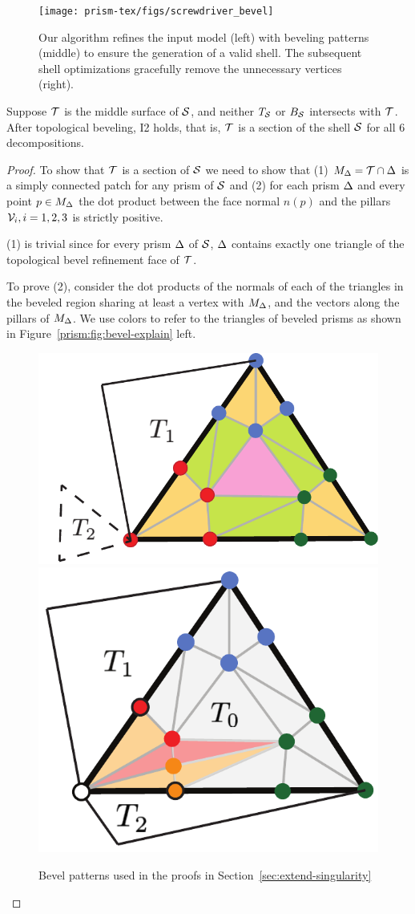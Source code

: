 \begin{figure}
    \texttt{[image: prism-tex/figs/screwdriver\_bevel]}
    \caption{Our algorithm refines the input model (left) with beveling patterns (middle) to ensure the generation of a valid shell. The subsequent shell optimizations gracefully remove the unnecessary vertices (right).}
    \label{prism:fig:beveled_example}
    
\end{figure}

\begin{theorem}
\label{thm:bevel}
Suppose $\T$ is the middle surface of $\S$, and neither $T_\S$ or $B_\S$ intersects with $\T$. After topological beveling, I2 holds, that is, $\T$ is a section of the shell $\S$ for all 6 decompositions.
\end{theorem}
\begin{proof}
    To show that $\T$ is a section of $\S$ we need to show that (1) $M_\Prism= \T \cap \Prism$ is a simply connected patch  for any prism of $\S$
and (2) for {each prism $\Prism$} and every point $p\in M_\Prism$ the dot product between the face normal $n(p)$ and the {pillars} $\V_i, i=1,2,3$ is strictly {positive}.

(1) is trivial since for every prism $\Prism$ of $\S$, $\Prism$ contains exactly one {triangle of the topological bevel refinement} face of $\T$.%


To prove (2), consider the dot products of the normals of each of the triangles in the beveled region sharing at least a vertex with $M_\Prism$, and the vectors along the pillars of $M_\Prism$.
We use colors to refer to the triangles of beveled prisms as shown in Figure~\ref{prism:fig:bevel-explain} left. 


\begin{figure}
    \centering
    \includegraphics[width=0.5\linewidth]{prism-tex/figs/bevel_colors}
    \includegraphics[width=0.4\linewidth]{prism-tex/figs/singularity-bevel-explained}
    \caption{Bevel patterns used in the proofs in Section~\ref{sec:extend-singularity}}
    

\end{figure}
\end{proof}
